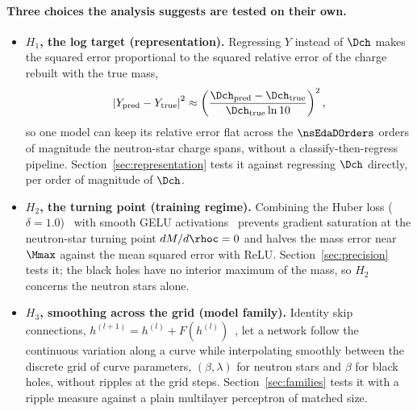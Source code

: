 \paragraph{Three choices the analysis suggests are tested on their own.}
\begin{itemize}
  \item \textbf{$H_1$, the log target (representation).} Regressing $Y$ instead of $\Dch$ makes the squared error proportional to the squared relative error of the charge rebuilt with the true mass,
  \[
    \left| Y_{\mathrm{pred}} - Y_{\mathrm{true}} \right|^2 \approx \left( \frac{\Dch_{\mathrm{pred}} - \Dch_{\mathrm{true}}}{\Dch_{\mathrm{true}} \ln 10} \right)^2 ,
  \]
  so one model can keep its relative error flat across the $\nsEdaDOrders$ orders of magnitude the neutron-star charge spans, without a classify-then-regress pipeline. Section~\ref{sec:representation} tests it against regressing $\Dch$ directly, per order of magnitude of $\Dch$.
  \item \textbf{$H_2$, the turning point (training regime).} Combining the Huber loss ($\delta = 1.0$)~\citep{Huber1964} with smooth GELU activations~\citep{Hendrycks2016_GELU} prevents gradient saturation at the neutron-star turning point $dM/d\rhoc = 0$ and halves the mass error near $\Mmax$ against the mean squared error with ReLU. Section~\ref{sec:precision} tests it; the black holes have no interior maximum of the mass, so $H_2$ concerns the neutron stars alone.
  \item \textbf{$H_3$, smoothing across the grid (model family).} Identity skip connections, $h^{(l+1)} = h^{(l)} + F(h^{(l)})$~\citep{He2016_ResNet}, let a network follow the continuous variation along a curve while interpolating smoothly between the discrete grid of curve parameters, $(\beta, \lambda)$ for neutron stars and $\beta$ for black holes, without ripples at the grid steps. Section~\ref{sec:families} tests it with a ripple measure against a plain multilayer perceptron of matched size.
\end{itemize}
